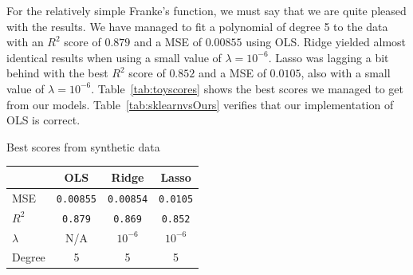 \documentclass[twoside,11pt]{report}
\begin{document}
For the relatively simple Franke's function, we must say that we are quite pleased with the results.
We have managed to fit a polynomial of degree 5 to the data with an $R^2$ score of $0.879$ and a MSE of $0.00855$ 
using OLS. Ridge yielded almost identical results  when using a small value of $\lambda = 10^{-6}$.
Lasso was lagging a bit behind with the best $R^2$ score of $0.852$ and a MSE of $0.0105$, 
also with a small value of $\lambda = 10^{-6}$. Table~\ref{tab:toyscores} shows the best scores we managed to get from our models. 
Table~\ref{tab:sklearnvsOurs} verifies that our implementation of OLS is correct.\\
\begin{mytable}[float=!h,label=tab:toyscores, width=0.5\textwidth]{Best scores from synthetic data}
\centering
\begin{tabular}{l|c|c|c}
    & OLS & Ridge & Lasso \\
    \hline
    MSE  &   \texttt{0.00855} & \texttt{0.00854} & \texttt{0.0105} \\
    $R^2$     &   \texttt{0.879} & \texttt{0.869} & \texttt{0.852} \\
    $\lambda$ &  N/A  & $10^{-6}$ & $10^{-6}$ \\
    Degree & 5 & 5 & 5
\end{tabular}%
\end{mytable}
\end{document}
